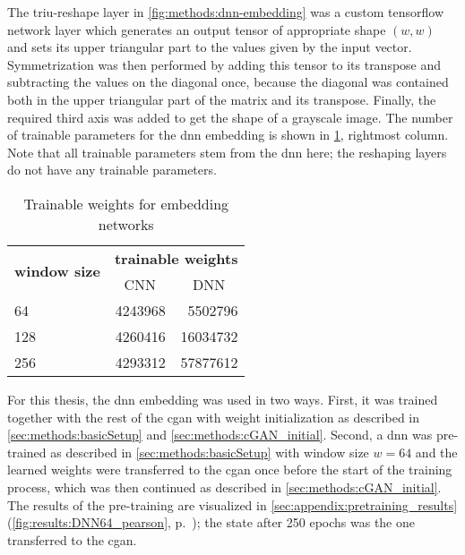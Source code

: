 The triu-reshape layer in \cref{fig:methods:dnn-embedding} was a custom tensorflow network layer which generates an output tensor
of appropriate shape $(w,w)$ and sets its upper triangular part to the values given by the input vector.
Symmetrization was then performed by adding this tensor to its transpose and subtracting the values on the diagonal once,
because the diagonal was contained both in the upper triangular part of the matrix and its transpose.
Finally, the required third axis was added to get the shape of a grayscale image.
The number of trainable parameters for the \acrshort{dnn} embedding is shown in \cref{tab:methods:embedding_network_params}, rightmost column.
Note that all trainable parameters stem from the \acrshort{dnn} here; the reshaping layers do not have any trainable parameters.
\begin{table}[htbp]
\centering
\begin{tabular}{lrr}
\hline
\multicolumn{1}{c}{\multirow{2}{*}{\textbf{window size}}} & \multicolumn{2}{c}{\textbf{trainable weights}}    \\
\multicolumn{1}{c}{}                                     & \multicolumn{1}{c}{CNN} & \multicolumn{1}{c}{DNN} \\ \hline
64                                                       & \SI{4243968}{}                 & \SI{5502796}{}                 \\
128                                                      & \SI{4260416}{}                 & \SI{16034732}{}                \\
256                                                      & \SI{4293312}{}                 & \SI{57877612}{}                \\ \hline
\end{tabular}
\caption{Trainable weights for embedding networks}\label{tab:methods:embedding_network_params}
\end{table}

For this thesis, the \acrshort{dnn} embedding was used in two ways.
First, it was trained together with the rest of the \acrshort{cgan} with weight initialization as described in 
\cref{sec:methods:basicSetup} and \ref{sec:methods:cGAN_initial}.
Second, a \acrshort{dnn} was pre-trained as described in \cref{sec:methods:basicSetup} with window size $w=64$
and the learned weights were transferred to the \acrshort{cgan} once before the start of the training process,
which was then continued as described in \cref{sec:methods:cGAN_initial}.
The results of the pre-training are visualized in \cref{sec:appendix:pretraining_results} (\cref{fig:results:DNN64_pearson}, p.~\pageref{fig:results:DNN64_pearson});
the state after 250 epochs was the one transferred to the \acrshort{cgan}.

